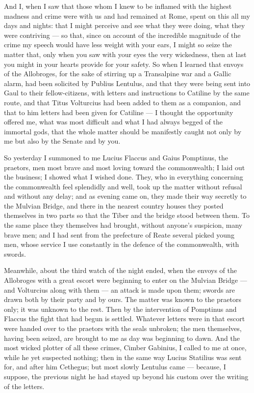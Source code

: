 And I, when I saw that those whom I knew to be inflamed with the highest madness and crime were with us and had remained at Rome, spent on this all my days and nights: that I might perceive and see what they were doing, what they were contriving --- so that, since on account of the incredible magnitude of the crime my speech would have less weight with your ears, I might so seize the matter that, only when you saw with your eyes the very wickedness, then at last you might in your hearts provide for your safety. So when I learned that envoys of the Allobroges, for the sake of stirring up a Transalpine war and a Gallic alarm, had been solicited by Publius Lentulus, and that they were being sent into Gaul to their fellow-citizens, with letters and instructions to Catiline by the same route, and that Titus Volturcius had been added to them as a companion, and that to him letters had been given for Catiline --- I thought the opportunity offered me, what was most difficult and what I had always begged of the immortal gods, that the whole matter should be manifestly caught not only by me but also by the Senate and by you.

 So yesterday I summoned to me Lucius Flaccus and Gaius Pomptinus, the praetors, men most brave and most loving toward the commonwealth; I laid out the business; I showed what I wished done. They, who in everything concerning the commonwealth feel splendidly and well, took up the matter without refusal and without any delay; and as evening came on, they made their way secretly to the Mulvian Bridge, and there in the nearest country houses they posted themselves in two parts so that the Tiber and the bridge stood between them. To the same place they themselves had brought, without anyone's suspicion, many brave men; and I had sent from the prefecture of Reate several picked young men, whose service I use constantly in the defence of the commonwealth, with swords.

 Meanwhile, about the third watch of the night ended, when the envoys of the Allobroges with a great escort were beginning to enter on the Mulvian Bridge --- and Volturcius along with them --- an attack is made upon them; swords are drawn both by their party and by ours. The matter was known to the praetors only; it was unknown to the rest. Then by the intervention of Pomptinus and Flaccus the fight that had begun is settled. Whatever letters were in that escort were handed over to the praetors with the seals unbroken; the men themselves, having been seized, are brought to me as day was beginning to dawn. And the most wicked plotter of all these crimes, Cimber Gabinius, I called to me at once, while he yet suspected nothing; then in the same way Lucius Statilius was sent for, and after him Cethegus; but most slowly Lentulus came --- because, I suppose, the previous night he had stayed up beyond his custom over the writing of the letters.

